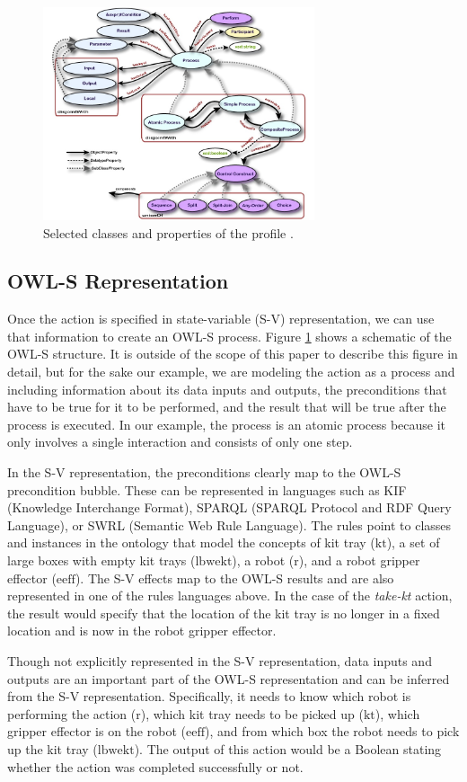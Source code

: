 \begin{figure}[htb]
\includegraphics[width=8cm]{images/OWL-S.jpg}
\caption{Selected classes and properties of the profile \cite{OWL-S}.}
\label{fig:OWL-S}
\end{figure}
\subsection{OWL-S Representation}
Once the action is specified in state-variable (S-V) representation, we can use that information to create an OWL-S process. Figure \ref{fig:OWL-S} shows a schematic of the OWL-S structure. It is outside of the scope of this paper to describe this figure in detail, but for the sake our example, we are modeling the action as a process and including information about its data inputs and outputs, the preconditions that have to be true for it to be performed, and the result that will be true after the process is executed. In our example, the process is an atomic process because it only involves a single interaction and consists of only one step.

In the S-V representation, the preconditions clearly map to the OWL-S precondition bubble. These can be represented in languages such as KIF \cite{KIF} (Knowledge Interchange Format), SPARQL \cite{SPARQL} (SPARQL Protocol and RDF Query Language), or SWRL \cite{SWRL-W3C} (Semantic Web Rule Language). The rules point to classes and instances in the ontology that model the concepts of kit tray ($\mathrm{kt}$), a set of large boxes with empty kit trays ($\mathrm{lbwekt}$), a robot ($\mathrm{r}$), and a robot gripper effector ($\mathrm{eeff}$). The S-V effects map to the OWL-S results and are also represented in one of the rules languages above. In the case of the \textsl{take-kt} action, the result would specify that the location of the kit tray is no longer in a fixed location and is now in the robot gripper effector.

Though not explicitly represented in the S-V representation, data inputs and outputs are an important part of the OWL-S representation and can be inferred from the S-V representation. Specifically, it needs to know which robot is performing the action ($\mathrm{r}$), which kit tray needs to be picked up ($\mathrm{kt}$), which gripper effector is on the robot ($\mathrm{eeff}$), and from which box the robot needs to pick up the kit tray ($\mathrm{lbwekt}$). The output of this action would be a Boolean stating whether the action was completed successfully or not. 